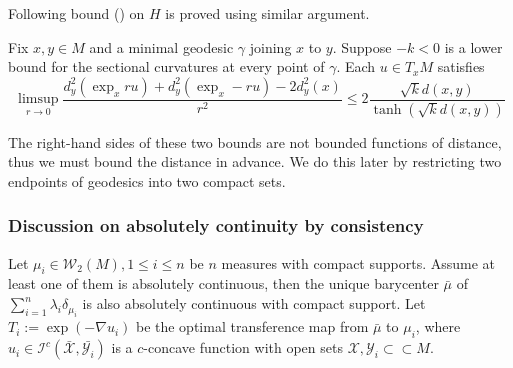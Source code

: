 Following bound (\cite[Lemma 3.12]{cordero2001riemannian}) on $H$ is proved using similar argument.
\begin{prop}
	\label{lem:hessian_bound_distance_squared}
	Fix \(  x , y \in M \) and
	a minimal geodesic \( \gamma \) joining \( x \) to \( y \).
	Suppose \( - k < 0 \) is a lower bound for
	the sectional curvatures at every point of \( \gamma \).
	Each \( u \in T _ { x } M \) satisfies
	\begin{equation*}
		\label{equa:hessian_bound_distance_squared}
		\limsup _ { r \rightarrow 0 } \frac { d _ { y } ^ { 2 } \left( \exp _ { x } r u \right) + d _ { y } ^ { 2 } \left( \exp _ { x } - r u \right) - 2 d _ { y } ^ { 2 } ( x ) }
		{ r ^ { 2 } } \leq 2 \frac{ \sqrt { k } d ( x , y ) }
		{\tanh ( \sqrt { k } d ( x , y ) )}
	\end{equation*}
\end{prop}

The right-hand sides of these two bounds are not bounded functions of distance,
thus we must bound the distance in advance.
We do this later by restricting two endpoints of geodesics into two compact sets.

\subsubsection{Discussion on absolutely continuity by consistency}

Let $\mu_i \in \mathcal{W}_2(M), 1 \leq i \leq n $ be $n$ measures with compact supports.
Assume at least one of them is absolutely continuous,
then the unique barycenter $\bar{\mu}$ of $\sum_{i=1}^n \lambda_i \delta_{\mu_i}$ is also absolutely continuous
with compact support.
Let $T_i:=\exp(-\nabla u_i)$ be the optimal transference map from $\bar{\mu}$ to $\mu_i$,
where $u_i \in \mathcal{I}^c(\bar{\mathcal{X}}, \bar{\mathcal{Y}_i})$ is a $c$-concave function
with open sets $\mathcal{X}, \mathcal{Y}_i \subset \subset M$.

